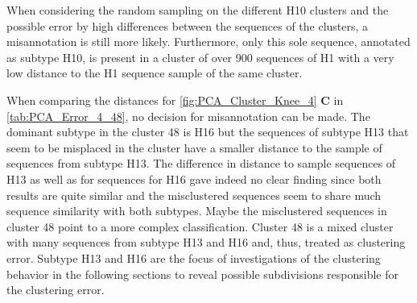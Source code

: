 \vspace{1em}

When considering the random sampling on the different H10 clusters and the possible error by high differences between the sequences of the clusters, a misannotation is still more likely. Furthermore, only this sole sequence, annotated as subtype H10, is present in a cluster of over 900 sequences of H1 with a very low distance to the H1 sequence sample of the same cluster. 

\begin{table}[!hbt]
    \centering
    \caption[Anomalies in segment 4 cluster 48 with PK]{\textbf{Anomalies in segment 4 cluster 48 with PK.} The \glspl{MSA} mean distance of the given sequences in comparison to a sample of H16 sequences of the same cluster and a sample of H13 sequences present in another cluster. Only the first 20 columns are presented here, the full table can be found in the \href{https://github.com/ahenoch/Masterthesis.git}{Projects GitHub Repository}.}
    \label{tab:PCA_Error_4_48}
\end{table}

When comparing the distances for \autoref{fig:PCA_Cluster_Knee_4} \textbf{\textsf{C}} in \autoref{tab:PCA_Error_4_48}, no decision for misannotation can be made. The dominant subtype in the cluster 48 is H16 but the sequences of subtype H13 that seem to be misplaced in the cluster have a smaller distance to the sample of sequences from subtype H13. The difference in distance to sample sequences of H13 as well as for sequences for H16 gave indeed no clear finding since both results are quite similar and the misclustered sequences seem to share much sequence similarity with both subtypes. Maybe the misclustered sequences in cluster 48 point to a more complex classification. Cluster 48 is a mixed cluster with many sequences from subtype H13 and H16 and, thus, treated as clustering error. Subtype H13 and H16 are the focus of investigations of the clustering behavior in the following sections to reveal possible subdivisions responsible for the clustering error.

